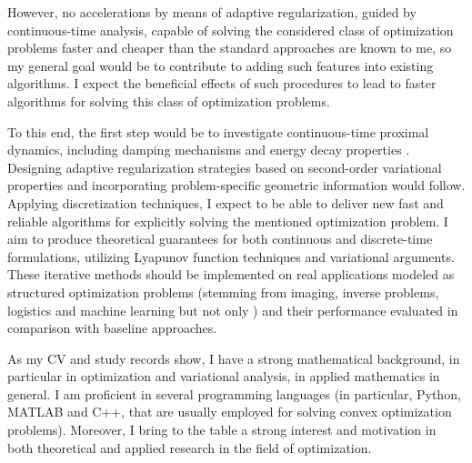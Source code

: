 \documentclass[12pt]{article}
\begin{document}
However, no accelerations by means of adaptive regularization, guided by continuous-time analysis, capable of solving the considered class of optimization problems faster and cheaper than the standard approaches \cite{Beck2009, Attouch2016, Apidopoulos2018} are known to me, so my general goal would be to contribute to adding such features into existing algorithms. I expect the beneficial effects of such procedures to lead to faster algorithms for solving this class of optimization problems.

To this end, the first step would be to investigate continuous-time proximal dynamics, including damping mechanisms and energy decay properties \cite{Attouch2013}. Designing adaptive regularization strategies based on second-order variational properties and incorporating problem-specific geometric information would follow. Applying discretization techniques, I expect to be able to deliver new fast and reliable algorithms for explicitly solving the mentioned optimization problem. I aim to produce theoretical guarantees for both continuous and discrete-time formulations, utilizing Lyapunov function techniques and variational arguments. These iterative methods should be implemented on real applications modeled as structured optimization problems (stemming from imaging, inverse problems, logistics and machine learning but not only \cite{Chambolle2011, Beck2017}) and their performance evaluated in comparison with baseline approaches.
\vspace{1ex}

As my CV and study records show, I have a strong mathematical background, in particular in optimization and variational analysis, in applied mathematics in general. I am proficient in several programming languages (in particular, Python, MATLAB and C++, that are usually employed for solving convex optimization problems). Moreover, I bring to the table a strong interest and motivation in both theoretical and applied research in the field of optimization.
\end{document}
